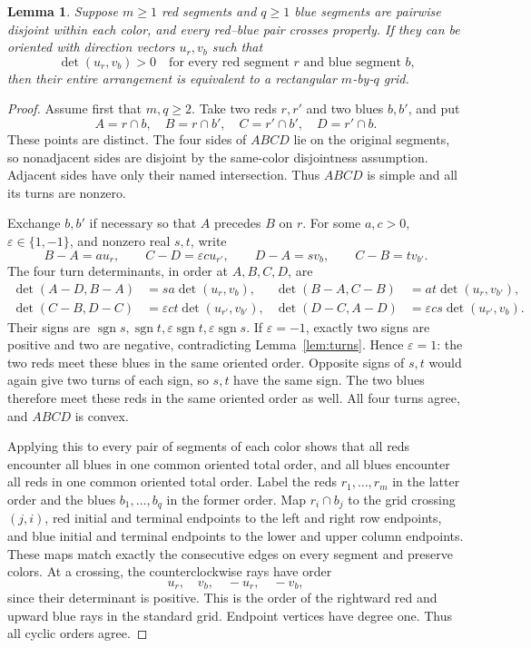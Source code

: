\documentclass[11pt]{article}
\newtheorem{lemma}[theorem]{Lemma}
\newcommand{\detv}[2]{\det(#1,#2)}
\begin{document}
\begin{lemma}\label{lem:embedding}
Suppose \(m\geq1\) red segments and \(q\geq1\) blue segments are
pairwise disjoint within each color, and every red--blue pair crosses
properly. If they can be oriented with direction vectors \(u_r,v_b\)
such that
\[
 \detv{u_r}{v_b}>0
 \quad\text{for every red segment \(r\) and blue segment \(b\),}
\]
then their entire arrangement is equivalent to a rectangular
\(m\)-by-\(q\) grid.
\end{lemma}
\begin{proof}
Assume first that \(m,q\geq2\). Take two reds \(r,r'\) and two blues
\(b,b'\), and put
\[
 A=r\cap b,\quad B=r\cap b',\quad C=r'\cap b',\quad D=r'\cap b.
\]
These points are distinct. The four sides of \(ABCD\) lie on the
original segments, so nonadjacent sides are disjoint by the
same-color disjointness assumption. Adjacent sides have only their
named intersection. Thus \(ABCD\) is simple and all its turns are nonzero.

Exchange \(b,b'\) if necessary so that \(A\) precedes \(B\) on \(r\).
For some \(a,c>0\), \(\varepsilon\in\{1,-1\}\), and nonzero real
\(s,t\), write
\[
 B-A=a u_r,\qquad C-D=\varepsilon c u_{r'},\qquad
 D-A=s v_b,\qquad C-B=t v_{b'}.
\]
The four turn determinants, in order at \(A,B,C,D\), are
\begin{align*}
 \detv{A-D}{B-A}&=sa\detv{u_r}{v_b},&
 \detv{B-A}{C-B}&=at\detv{u_r}{v_{b'}},\\
 \detv{C-B}{D-C}&=\varepsilon ct\detv{u_{r'}}{v_{b'}},&
 \detv{D-C}{A-D}&=\varepsilon cs\detv{u_{r'}}{v_b}.
\end{align*}
Their signs are
\(\operatorname{sgn}s,\operatorname{sgn}t,
\varepsilon\operatorname{sgn}t,\varepsilon\operatorname{sgn}s\).
If \(\varepsilon=-1\), exactly two signs are positive and two are
negative, contradicting Lemma~\ref{lem:turns}. Hence
\(\varepsilon=1\): the two reds meet these blues in the same oriented
order. Opposite signs of \(s,t\) would again give two turns of each
sign, so \(s,t\) have the same sign. The two blues therefore meet
these reds in the same oriented order as well. All four turns agree,
and \(ABCD\) is convex.

Applying this to every pair of segments of each color shows that all
reds encounter all blues in one common oriented total order, and all
blues encounter all reds in one common oriented total order.
Label the reds \(r_1,\ldots,r_m\) in the latter order and the blues
\(b_1,\ldots,b_q\) in the former order. Map \(r_i\cap b_j\) to the
grid crossing \((j,i)\), red initial and terminal endpoints to the left
and right row endpoints, and blue initial and terminal endpoints to the
lower and upper column endpoints. These maps match exactly the
consecutive edges on every segment and preserve colors.
At a crossing, the counterclockwise rays have order
\[
 u_r,\quad v_b,\quad -u_r,\quad -v_b,
\]
since their determinant is positive. This is the order of the
rightward red and upward blue rays in the standard grid. Endpoint
vertices have degree one. Thus all cyclic orders agree.


\end{proof}
\end{document}
